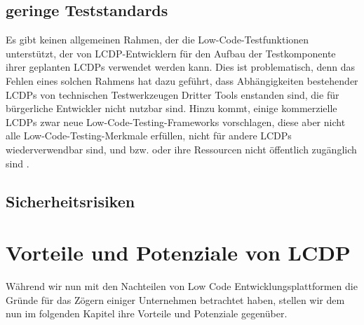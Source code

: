 \documentclass[12pt]{article} %
\begin{document}
	\subsection{geringe Teststandards} 
	Es gibt keinen allgemeinen Rahmen, der die Low-Code-Testfunktionen unterstützt, der von LCDP-Entwicklern für den Aufbau der Testkomponente ihrer geplanten LCDPs verwendet werden kann. Dies ist problematisch, denn das Fehlen eines solchen Rahmens hat dazu geführt, dass Abhängigkeiten bestehender LCDPs von technischen Testwerkzeugen Dritter Tools enstanden sind, die für bürgerliche Entwickler nicht nutzbar sind. Hinzu kommt, einige kommerzielle LCDPs zwar neue Low-Code-Testing-Frameworks vorschlagen, diese aber nicht alle  Low-Code-Testing-Merkmale erfüllen, nicht für andere LCDPs wiederverwendbar sind, und bzw. oder ihre Ressourcen nicht öffentlich zugänglich sind \cite{Khorram.2020}.	
	
	\subsection{Sicherheitsrisiken}	
	
	\cite{Guerra.2020}
	
	
	
	
	
	
	
	\section{Vorteile  und Potenziale von LCDP}
	Während wir nun mit den Nachteilen von Low Code Entwicklungsplattformen die Gründe für das Zögern einiger Unternehmen betrachtet haben, stellen wir dem nun im folgenden Kapitel ihre Vorteile und Potenziale gegenüber.
	
	
\end{document}
